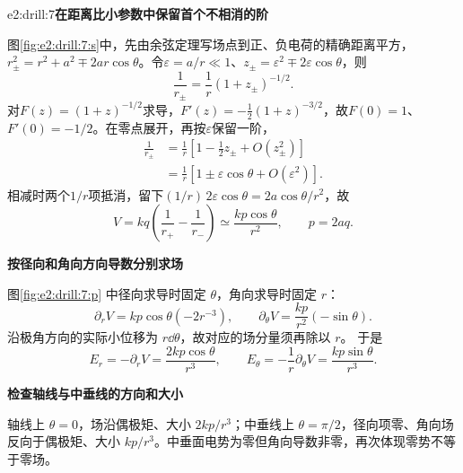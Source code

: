 \begin{drillsolution}{e2:drill:7}\textbf{在距离比小参数中保留首个不相消的阶}\par\nobreak
图\ref{fig:e2:drill:7:s}中，先由余弦定理写场点到正、负电荷的精确距离平方，$r_\pm^2=r^2+a^2\mp2ar\cos\theta$。令$\varepsilon=a/r\ll1$、$z_\pm=\varepsilon^2\mp2\varepsilon\cos\theta$，则
\[
\frac1{r_\pm}=\frac1r(1+z_\pm)^{-1/2}.
\]
对$F(z)=(1+z)^{-1/2}$求导，$F'(z)=-\tfrac12(1+z)^{-3/2}$，故$F(0)=1$、$F'(0)=-1/2$。在零点展开，再按$\varepsilon$保留一阶，
\[
\begin{aligned}
\frac1{r_\pm}
&=\frac1r[1-\tfrac12z_\pm+O(z_\pm^2)]\\
&=\frac1r[1\pm\varepsilon\cos\theta+O(\varepsilon^2)].
\end{aligned}
\]
相减时两个$1/r$项抵消，留下$(1/r)\,2\varepsilon\cos\theta=2a\cos\theta/r^2$，故
\[
 V=kq\left(\frac1{r_+}-\frac1{r_-}\right)
 \simeq\frac{kp\cos\theta}{r^2},\qquad p=2aq.
\]



\par\medskip{}\noindent\textbf{按径向和角向方向导数分别求场}\par\nobreak
图\ref{fig:e2:drill:7:p} 中径向求导时固定 $\theta$，角向求导时固定 $r$：
\[
 \partial_rV=kp\cos\theta(-2r^{-3}),\qquad
 \partial_\theta V=\frac{kp}{r^2}(-\sin\theta).
\]
沿极角方向的实际小位移为 $r\dd\theta$，故对应的场分量须再除以 $r$。
于是
\[
 E_r=-\partial_rV=\frac{2kp\cos\theta}{r^3},\qquad
 E_\theta=-\frac1r\partial_\theta V=\frac{kp\sin\theta}{r^3}.
\]

\par\medskip{}\noindent\textbf{检查轴线与中垂线的方向和大小}\par\nobreak
轴线上 $\theta=0$，场沿偶极矩、大小 $2kp/r^3$；中垂线上 $\theta=\pi/2$，径向项零、角向场反向于偶极矩、大小 $kp/r^3$。中垂面电势为零但角向导数非零，再次体现零势不等于零场。\end{drillsolution}
